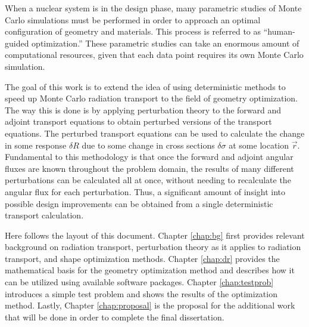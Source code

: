 When a nuclear system is in the design phase, many parametric studies of Monte Carlo simulations must be performed in order to approach an optimal configuration of geometry and materials.
This process is referred to as ``human-guided optimization.''
These parametric studies can take an enormous amount of computational resources, given that each data point requires its own Monte Carlo simulation.

The goal of this work is to extend the idea of using deterministic methods to speed up Monte Carlo radiation transport to the field of geometry optimization.
The way this is done is by applying perturbation theory to the forward and adjoint transport equations to obtain perturbed versions of the transport equations.
The perturbed transport equations can be used to calculate the change in some response $\delta R$ due to some change in cross sections $\delta\sigma$ at some location $\vec{r}$.
Fundamental to this methodology is that once the forward and adjoint angular fluxes are known throughout the problem domain, the results of many different perturbations can be calculated all at once, without needing to recalculate the angular flux for each perturbation.
Thus, a significant amount of insight into possible design improvements can be obtained from a single deterministic transport calculation.

Here follows the layout of this document.
Chapter \ref{chap:bg} first provides relevant background on radiation transport, perturbation theory as it applies to radiation transport, and shape optimization methods.
Chapter \ref{chap:dr} provides the mathematical basis for the geometry optimization method and describes how it can be utilized using available software packages.
Chapter \ref{chap:testprob} introduces a simple test problem and shows the results of the optimization method.
Lastly, Chapter \ref{chap:proposal} is the proposal for the additional work that will be done in order to complete the final dissertation.


